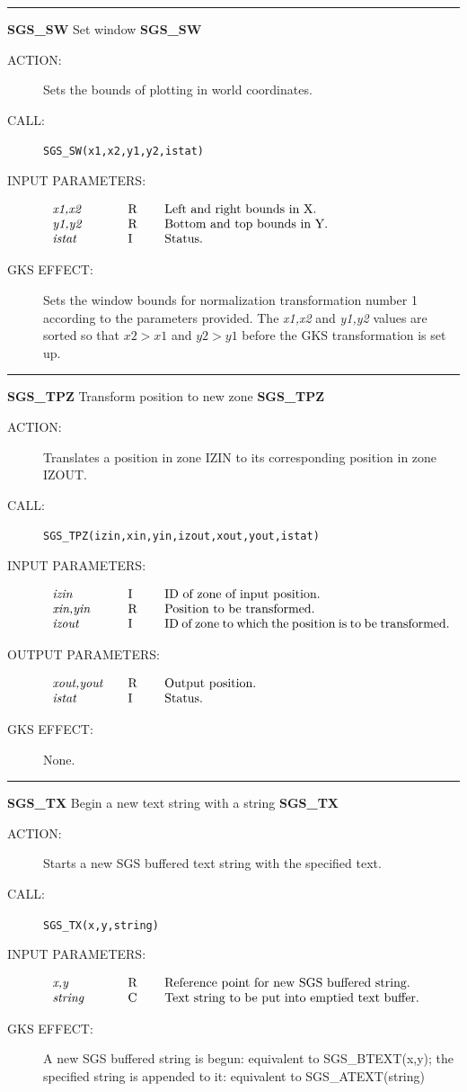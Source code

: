 \documentclass[11pt]{article}
\newcommand{\htmlref}[2]{#1}
\newcommand{\xlabel}[1]{}
\newcommand{\rthead}[2]{\rule{\textwidth}{0.3mm}
{\Large {\bf #1} \hfill #2 \hfill {\bf #1}}}
\newenvironment{params}%
{\[\begin{tabular}{p{0.14\textwidth}p{0.05\textwidth}p{0.66\textwidth}}}%
{\end{tabular}\]}
\newcommand{\rparams}[3]{{\em #1} &#2 &#3\\}
\newcommand{\rthead}[2]{\subsection{\label{#1}\xlabel{#1}#1 - #2}}
\newenvironment{params}{\begin{description}}{\end{description}}
\newcommand{\rparams}[3]{\item{{\em #1}} (#2) #3}
\begin{document}
\rthead{SGS\_SW}{Set window}
\begin{description}
\item [ACTION:]
Sets the bounds of plotting in world coordinates.
\item [CALL:]
{\tt SGS\_SW(x1,x2,y1,y2,istat)}
\item [INPUT PARAMETERS:]
\begin{params}
\rparams{x1,x2}{R}{Left and right bounds in X.}
\rparams{y1,y2}{R}{Bottom and top bounds in Y.}
\rparams{istat}{I}{Status.}
\end{params}
\item [GKS EFFECT:]
Sets the window bounds for normalization transformation number 1 according to
the parameters provided.
The {\it x1,x2} and {\it y1,y2} values are sorted so that $\mathit{x2}>
\mathit{x1}$ and $\mathit{y2}>\mathit{y1}$ before the GKS transformation is set up.
\end{description}
\goodbreak

\rthead{SGS\_TPZ}{Transform position to new zone}
\begin{description}
\item [ACTION:]
Translates a position in zone IZIN to its corresponding position in zone IZOUT.
\item [CALL:]
{\tt SGS\_TPZ(izin,xin,yin,izout,xout,yout,istat)}
\item [INPUT PARAMETERS:]
\begin{params}
\rparams{izin}{I}{ID of zone of input position.}
\rparams{xin,yin}{R}{Position to be transformed.}
\rparams{izout}{I}{ID of zone to which the position is to be transformed.}
\end{params}
\item [OUTPUT PARAMETERS:]
\begin{params}
\rparams{xout,yout}{R}{Output position.}
\rparams{istat}{I}{Status.}
\end{params}
\item [GKS EFFECT:]
None.
\end{description}
\goodbreak

\rthead{SGS\_TX}{Begin a new text string with a string}
\begin{description}
\item [ACTION:]
Starts a new SGS buffered text string with the specified text.
\item [CALL:]
{\tt SGS\_TX(x,y,string)}
\item [INPUT PARAMETERS:]
\begin{params}
\rparams{x,y}{R}{Reference point for new SGS buffered string.}
\rparams{string}{C}{Text string to be put into emptied text buffer.}
\end{params}
\item [GKS EFFECT:]
A new SGS buffered string is begun: equivalent to
\htmlref{SGS\_BTEXT}{SGS_BTEXT}(x,y); the
specified string is appended to it: equivalent to
\htmlref{SGS\_ATEXT}{SGS_ATEXT}(string)
\end{description}
\goodbreak
\end{document}
